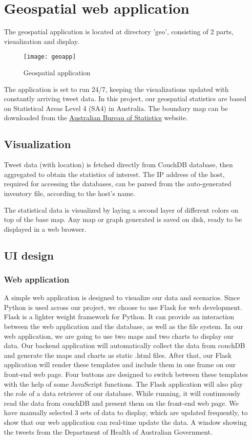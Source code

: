 \section{Geospatial web application}
The geospatial application is located at directory 'geo', consisting of 2 parts, visualization and display.  

\begin{figure}[h]
\centering
\texttt{[image: geoapp]}
\caption{Geospatial application}
\end{figure}

The application is set to run 24/7, keeping the visualizations updated with constantly arriving tweet data. In this project, our geospatial statistics are based on Statistical Areas Level 4 (SA4) in Australia. The boundary map can be downloaded from the \href{https://www.abs.gov.au/}{Australian Bureau of Statistics} website.  

\subsection{Visualization}
Tweet data (with location) is fetched directly from CouchDB database, then aggregated to obtain the statistics of interest. The IP address of the host, required for accessing the databases, can be parsed from the auto-generated inventory file, according to the host's name.  

The statistical data is visualized by laying a second layer of different colors on top of the base map. Any map or graph generated is saved on disk, ready to be displayed in a web browser.  

\subsection{UI design}
\subsubsection{Web application}
A simple web application is designed to visualize our data and scenarios. Since Python is used across our project, we choose to use Flask for web development. Flask is a lighter weight framework for Python. It can provide an interaction between the web application and the database, as well as the file system. In our web application, we are going to use two maps and two charts to display our data. Our backend application will automatically collect the data from couchDB and generate the maps and charts as static .html files. After that, our Flask application will render these templates and include them in one frame on our front-end web page. Four buttons are designed to switch between these templates with the help of some JavaScript functions. The Flask application will also play the role of a data retriever of our database. While running, it will continuously read the data from couchDB and present them on the front-end web page. We have manually selected 3 sets of data to display, which are updated frequently, to show that our web application can real-time update the data. A window showing the tweets from the Department of Health of Australian Government. 

